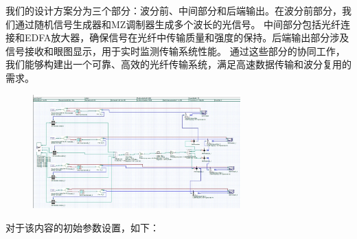 \documentclass[12pt]{article}
\begin{document}
我们的设计方案分为三个部分：波分前、中间部分和后端输出。在波分前部分，我们通过随机信号生成器和MZ调制器生成多个波长的光信号。
中间部分包括光纤连接和EDFA放大器，确保信号在光纤中传输质量和强度的保持。后端输出部分涉及信号接收和眼图显示，用于实时监测传输系统性能。
通过这些部分的协同工作，我们能够构建出一个可靠、高效的光纤传输系统，满足高速数据传输和波分复用的需求。
\begin{figure}[htbp]
	\centering
	\includegraphics[width=8cm]{figure3.png}
\end{figure}
对于该内容的初始参数设置，如下：
\end{document}
